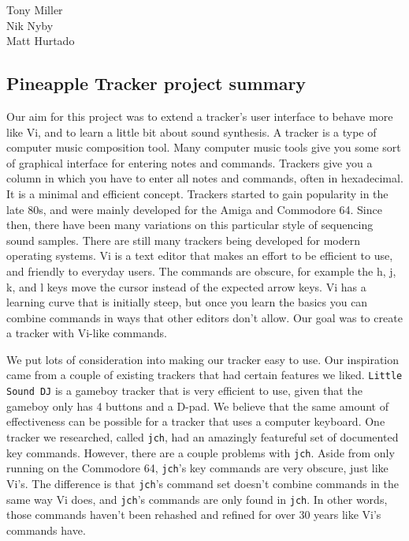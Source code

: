 \documentclass[12pt,letterpaper]{article}
\begin{document}
\begin{flushright}
Tony Miller\\
Nik Nyby\\
Matt Hurtado
\end{flushright}

\begin{center}
\section*{Pineapple Tracker project summary}
\end{center}

\doublespacing

\par
Our aim for this project was to extend a tracker's user interface to behave more like Vi, and to learn a little bit about sound synthesis.
A tracker is a type of computer music composition tool.
Many computer music tools give you some sort of graphical interface for entering notes and commands.
Trackers give you a column in which you have to enter all notes and commands, often in hexadecimal.
It is a minimal and efficient concept.
Trackers started to gain popularity in the late 80s, and were mainly developed for the Amiga and Commodore 64.
Since then, there have been many variations on this particular style of sequencing sound samples.
There are still many trackers being developed for modern operating systems.
Vi is a text editor that makes an effort to be efficient to use, and friendly to everyday users.
The commands are obscure, for example the h, j, k, and l keys move the cursor instead of the expected arrow keys.
Vi has a learning curve that is initially steep, but once you learn the basics you can combine commands in ways that other editors don't allow.
Our goal was to create a tracker with Vi-like commands.

\par
We put lots of consideration into making our tracker easy to use.
Our inspiration came from a couple of existing trackers that had certain features we liked.
{\tt Little Sound DJ} is a gameboy tracker that is very efficient to use, given that the gameboy only has 4 buttons and a D-pad.
We believe that the same amount of effectiveness can be possible for a tracker that uses a computer keyboard.
One tracker we researched, called {\tt jch}, had an amazingly featureful set of documented key commands.
However, there are a couple problems with {\tt jch}.
Aside from only running on the Commodore 64, {\tt jch}'s key commands are very obscure, just like Vi's.
The difference is that {\tt jch}'s command set doesn't combine commands in the same way Vi does, and {\tt jch}'s commands are only found in {\tt jch}.
In other words, those commands haven't been rehashed and refined for over 30 years like Vi's commands have.
\end{document}
